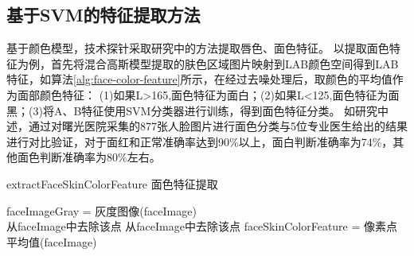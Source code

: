 \subsection{基于SVM的特征提取方法}
基于颜色模型，技术探针采取研究\cite{Hu2016Robust, Zhao2014Qualitative}中的方法提取唇色、面色特征。
以提取面色特征为例，首先将混合高斯模型提取的肤色区域图片映射到LAB颜色空间得到LAB特征，如算法\ref{alg:face-color-feature}所示，在经过去噪处理后，取颜色的平均值作为面部颜色特征：
(1)如果L>165,面色特征为面白；(2)如果L<125,面色特征为面黑；(3)将A、B特征使用SVM分类器进行训练，得到面色特征分类。
如研究\cite{Zhao2014Qualitative}中述，通过对曙光医院采集的877张人脸图片进行面色分类与5位专业医生给出的结果进行对比验证，对于面红和正常准确率达到90\%以上，面白判断准确率为74\%，其他面色判断准确率为80\%左右。

\begin{algorithm}[htbp]
    \caption{extractFaceSkinColorFeature 面色特征提取\cite{Zhao2014Qualitative}}%
    \label{alg:face-color-feature}
    \LinesNumbered %
    faceImageGray = 灰度图像(faceImage)\\

     {
         {
            从faceImage中去除该点
        }
         {
            从faceImage中去除该点
        }
    }
    faceSkinColorFeature = 像素点平均值(faceImage)\\
    \\
\end{algorithm}

